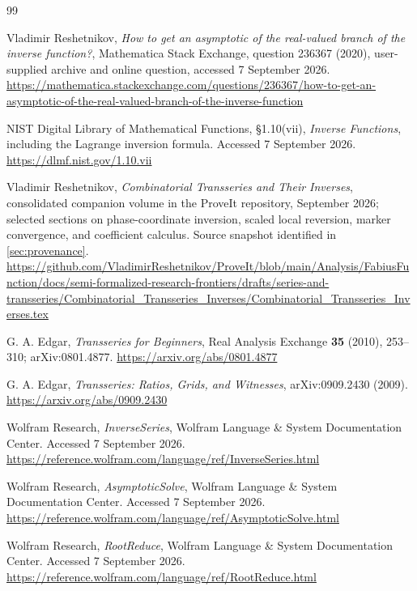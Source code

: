 \documentclass[11pt,a4paper]{article}
\numberwithin{equation}{section}
\theoremstyle{definition}\newtheorem{definition}[theorem]{Definition}
\theoremstyle{remark}\newtheorem{remark}[theorem]{Remark}
\begin{document}
\begin{thebibliography}{99}

Vladimir Reshetnikov,
\emph{How to get an asymptotic of the real-valued branch of the inverse
function?}, Mathematica Stack Exchange, question 236367 (2020),
user-supplied archive and online question, accessed 7 September 2026.
\url{https://mathematica.stackexchange.com/questions/236367/how-to-get-an-asymptotic-of-the-real-valued-branch-of-the-inverse-function}

NIST Digital Library of Mathematical Functions,
\S1.10(vii), \emph{Inverse Functions}, including the Lagrange inversion
formula. Accessed 7 September 2026.
\url{https://dlmf.nist.gov/1.10.vii}

Vladimir Reshetnikov,
\emph{Combinatorial Transseries and Their Inverses}, consolidated
companion volume in the ProveIt repository, September 2026;
selected sections on phase-coordinate inversion, scaled local reversion,
marker convergence, and coefficient calculus. Source snapshot identified
in \cref{sec:provenance}.
\url{https://github.com/VladimirReshetnikov/ProveIt/blob/main/Analysis/FabiusFunction/docs/semi-formalized-research-frontiers/drafts/series-and-transseries/Combinatorial_Transseries_Inverses/Combinatorial_Transseries_Inverses.tex}

G. A. Edgar,
\emph{Transseries for Beginners}, Real Analysis Exchange
\textbf{35} (2010), 253--310; arXiv:0801.4877.
\url{https://arxiv.org/abs/0801.4877}

G. A. Edgar,
\emph{Transseries: Ratios, Grids, and Witnesses}, arXiv:0909.2430 (2009).
\url{https://arxiv.org/abs/0909.2430}

Wolfram Research,
\emph{InverseSeries}, Wolfram Language \& System Documentation Center.
Accessed 7 September 2026.
\url{https://reference.wolfram.com/language/ref/InverseSeries.html}

Wolfram Research,
\emph{AsymptoticSolve}, Wolfram Language \& System Documentation Center.
Accessed 7 September 2026.
\url{https://reference.wolfram.com/language/ref/AsymptoticSolve.html}

Wolfram Research,
\emph{RootReduce}, Wolfram Language \& System Documentation Center.
Accessed 7 September 2026.
\url{https://reference.wolfram.com/language/ref/RootReduce.html}

\end{thebibliography}
\end{document}
